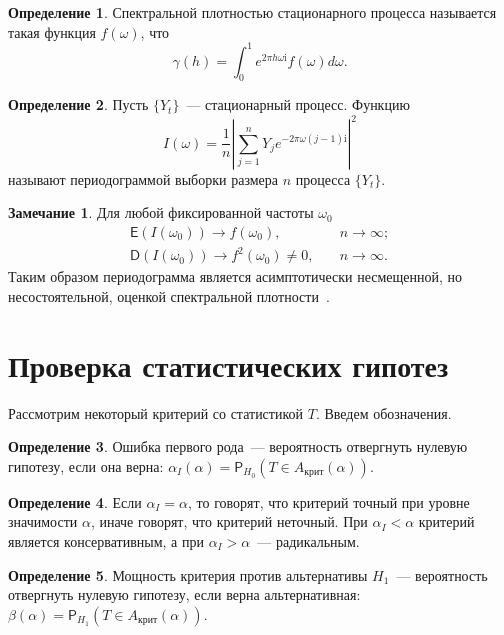 \documentclass[specialist,
substylefile = spbu_report.rtx,
subf,12pt]{disser}
\theoremstyle{definition}
\newtheorem{definition}{Определение}[chapter]
\newtheorem{remark}{Замечание}[chapter]
\newcommand{\im}{\mathrm{i}}
\begin{document}
\begin{definition}
	Спектральной плотностью стационарного процесса называется такая функция $f(\omega)$, что
	\[
		\gamma(h)=\int_{0}^{1} e^{2\pi h\omega\im}f(\omega)d\omega.
	\]
\end{definition}
\begin{definition}
	Пусть $\{Y_t\}$~--- стационарный процесс. Функцию
	\begin{equation}\label{eq:pgram}
		I(\omega)=\frac1n\left|\sum_{j=1}^{n} Y_je^{-2\pi \omega (j-1)\mathrm{i}}\right|^2
	\end{equation}
	называют периодограммой выборки размера $n$ процесса $\{Y_t\}$.
\end{definition}
\begin{remark}
	Для любой фиксированной частоты $\omega_0$
	\begin{align*}
		\mathsf{E}\left(I(\omega_0)\right)\to f(\omega_0),\quad       & n\to \infty; \\
		\mathsf{D}\left(I(\omega_0)\right)\to f^2(\omega_0)\ne0,\quad & n\to\infty.
	\end{align*}
	Таким образом периодограмма является асимптотически несмещенной, но несостоятельной, оценкой спектральной плотности~\cite[Раздел 4.5]{Hassler2018}.
\end{remark}

\section{Проверка статистических гипотез}

Рассмотрим некоторый критерий со статистикой $T$. Введем обозначения.
\begin{definition}
	Ошибка первого рода~--- вероятность отвергнуть нулевую гипотезу, если она верна: $\alpha_I(\alpha)=\mathsf P_{H_0}(T\in A_\text{крит}(\alpha))$.
\end{definition}
\begin{definition}
	Если $\alpha_I=\alpha$, то говорят, что критерий точный при уровне значимости $\alpha$, иначе говорят, что критерий неточный. При $\alpha_I<\alpha$ критерий является консервативным, а при $\alpha_I>\alpha$~--- радикальным.
\end{definition}
\begin{definition}
	Мощность критерия против альтернативы $H_1$~--- вероятность отвергнуть нулевую гипотезу, если верна альтернативная: $\beta(\alpha)=\mathsf P_{H_1}(T\in A_\text{крит}(\alpha))$.
\end{definition}
\end{document}
